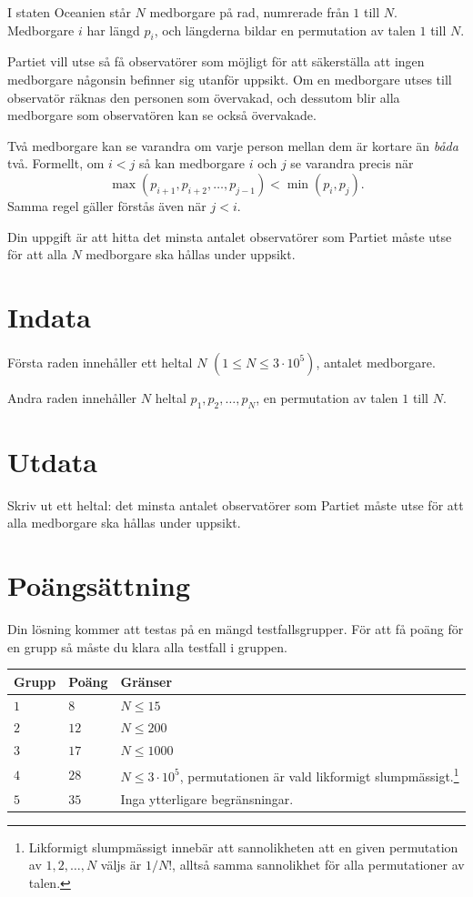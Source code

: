 \noindent

I staten Oceanien står $N$ medborgare på rad, numrerade från $1$ till $N$.
Medborgare $i$ har längd $p_i$, och längderna bildar en permutation av talen $1$ till $N$.

Partiet vill utse så få observatörer som möjligt för att säkerställa att ingen medborgare någonsin befinner sig utanför uppsikt.
Om en medborgare utses till observatör räknas den personen som övervakad, och dessutom blir alla medborgare som observatören kan se också övervakade.

Två medborgare kan se varandra om varje person mellan dem är kortare än \emph{båda} två.
Formellt, om $i < j$ så kan medborgare $i$ och $j$ se varandra precis när
\[
\max(p_{i+1}, p_{i+2}, \dots, p_{j-1}) < \min(p_i, p_j).
\]
Samma regel gäller förstås även när $j < i$.

Din uppgift är att hitta det minsta antalet observatörer som Partiet måste utse för att alla $N$ medborgare ska hållas under uppsikt.

\section*{Indata}

Första raden innehåller ett heltal $N$ $(1 \leq N \leq 3 \cdot 10^5)$, antalet medborgare.

Andra raden innehåller $N$ heltal $p_1, p_2, \dots, p_N$, en permutation av talen $1$ till $N$.

\section*{Utdata}

Skriv ut ett heltal: det minsta antalet observatörer som Partiet måste utse för att alla medborgare ska hållas under uppsikt.

\section*{Poängsättning}
Din lösning kommer att testas på en mängd testfallsgrupper.
För att få poäng för en grupp så måste du klara alla testfall i gruppen.

\noindent
\begin{tabular}{| l | l | p{12cm} |}
  \hline
  \textbf{Grupp} & \textbf{Poäng} & \textbf{Gränser} \\ \hline
  $1$ & $8$ & $N \leq 15$ \\ \hline
  $2$ & $12$ & $N \leq 200$ \\ \hline
  $3$ & $17$ & $N \leq 1000$ \\ \hline
  $4$ & $28$ & $N \leq 3 \cdot 10^5$, permutationen är vald likformigt slumpmässigt.\footnote{Likformigt slumpmässigt innebär att sannolikheten att en given permutation av $1,2,\dots,N$ väljs är $1/N!$, alltså samma sannolikhet för alla permutationer av talen.}
 \\ \hline
  $5$ & $35$ & Inga ytterligare begränsningar. \\ \hline
\end{tabular}


